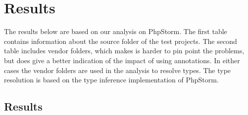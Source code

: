 \documentclass[main.tex]{subfiles}
\begin{document}
    \chapter{Results}\label{ch:results}
    The results below are based on our analysis on PhpStorm.
    The first table contains information about the source folder of the test projects.
    The second table includes vendor folders, which makes is harder to pin point the problems, but does give a better indication of the impact of using annotations.
    In either cases the vendor folders are used in the analysis to resolve types.
    The type resolution is based on the type inference implementation of PhpStorm.
    
    \section{Results}
\npaddmissingzero
\npfourdigitsep
\end{document}
